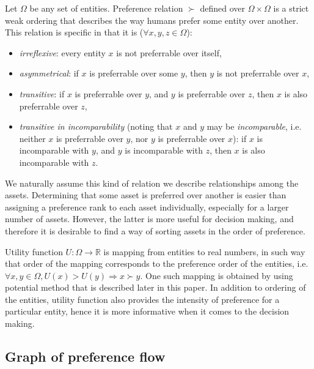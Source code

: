 \documentclass[letterpaper, 10pt, conference]{ieeeconf}
\begin{document}
  Let $\Omega$ be any set of entities.
  Preference relation $\succ$ defined over $\Omega \times \Omega$ is a strict weak ordering that describes the way humans prefer some entity over another.
  This relation is specific in that it is ($\forall x, y, z \in \Omega$):
  \begin{itemize}
    \item \textit{irreflexive}: every entity $x$ is not preferrable over itself, %
    \item \textit{asymmetrical}: if $x$ is preferrable over some $y$, then $y$ is not preferrable over $x$, %
    \item \textit{transitive}: if $x$ is preferrable over $y$, and $y$ is preferrable over $z$, then $x$ is also preferrable over $z$, %
    \item \textit{transitive in incomparability} (noting that $x$ and $y$ may be \textit{incomparable}, i.e. neither $x$ is preferrable over $y$, nor $y$ is preferrable over $x$): if $x$ is incomparable with $y$, and $y$ is incomparable with $z$, then $x$ is also incomparable with $z$.
  \end{itemize}

  We naturally assume this kind of relation we describe relationships among the assets.
  Determining that some asset is preferred over another is easier than assigning a preference rank to each asset individually, especially for a larger number of assets.
  However, the latter is more useful for decision making, and therefore it is desirable to find a way of sorting assets in the order of preference.
  
  Utility function $U\colon \Omega \to \mathbb{R}$ is mapping from entities to real numbers, in such way that order of the mapping corresponds to the preference order of the entities, i.e. $\forall x, y \in \Omega, U(x) > U(y) \Rightarrow x \succ y$.
  One such mapping is obtained by using potential method that is described later in this paper.
  In addition to ordering of the entities, utility function also provides the intensity of preference for a particular entity, hence it is more informative when it comes to the decision making.
  
  \subsection{Graph of preference flow}
  
\end{document}
